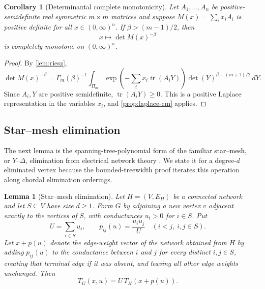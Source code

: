 \documentclass[preprint,12pt,authoryear]{elsarticle}
\numberwithin{equation}{section}
\newtheorem{lemma}[theorem]{Lemma}
\newtheorem{corollary}[theorem]{Corollary}
\theoremstyle{definition}
\theoremstyle{remark}
\newcommand{\tr}{\operatorname{tr}}
\newcommand{\1}{\mathbf{1}}
\begin{document}
\begin{corollary}[Determinantal complete monotonicity]
\label{cor:det-cm}
Let $A_1,\ldots,A_n$ be positive-semidefinite real symmetric $m\times m$ matrices and suppose $M(x)=\sum_i x_i A_i$ is positive definite for all $x\in(0,\infty)^n$.  If $\beta>(m-1)/2$, then
\begin{equation}
        x\longmapsto \det M(x)^{-\beta}
\end{equation}
is completely monotone on $(0,\infty)^n$.
\end{corollary}

\begin{proof}
By \cref{lem:riesz},
\begin{equation}
\det M(x)^{-\beta}
=\Gamma_m(\beta)^{-1}\int_{\Pi_m}
\exp\left(-\sum_i x_i\tr(A_iY)\right)
\det(Y)^{\beta-(m+1)/2}\,dY .
\end{equation}
Since $A_i,Y$ are positive semidefinite, $\tr(A_iY)\ge0$.  This is a positive Laplace representation in the variables $x_i$, and \cref{prop:laplace-cm} applies.
\end{proof}

\subsection{Star--mesh elimination}

The next lemma is the spanning-tree-polynomial form of the familiar star--mesh, or $Y$--$\Delta$, elimination from electrical network theory \cite{DoyleSnell1984,CurtisIngermanMorrow1998}.  We state it for a degree-\(d\) eliminated vertex because the bounded-treewidth proof iterates this operation along chordal elimination orderings.

\begin{lemma}[Star--mesh elimination]
\label{lem:starmesh}
Let \(H=(V,E_H)\) be a connected network and let \(S\subseteq V\) have size \(d\ge1\).  Form \(G\) by adjoining a new vertex \(v\) adjacent exactly to the vertices of \(S\), with conductances \(u_i>0\) for \(i\in S\).  Put
\begin{equation}
        U=\sum_{i\in S}u_i,
        \qquad
        p_{ij}(u)=\frac{u_i u_j}{U}
        \quad (i<j,\ i,j\in S).
\end{equation}
Let \(x+p(u)\) denote the edge-weight vector of the network obtained from \(H\) by adding \(p_{ij}(u)\) to the conductance between \(i\) and \(j\) for every distinct \(i,j\in S\), creating that terminal edge if it was absent, and leaving all other edge weights unchanged.  Then
\begin{equation}
        T_G(x,u)=U\,T_H(x+p(u)).
\end{equation}
\end{lemma}
\end{document}
